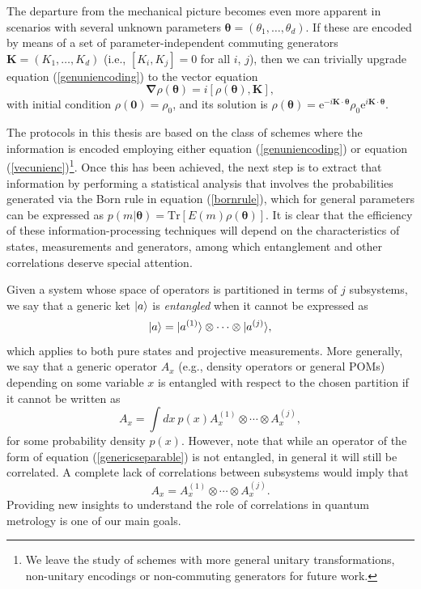 The departure from the mechanical picture becomes even more apparent in scenarios with several unknown parameters $\boldsymbol{\theta} = (\theta_1, \dots, \theta_d)$. If these are encoded by means of a set of parameter-independent commuting generators $\boldsymbol{K} = (K_1, \dots, K_d)$ (i.e., $[K_i, K_j] = 0$ for all $i$, $j$), then we can trivially upgrade equation (\ref{genuniencoding}) to the vector equation 
\begin{equation}
\boldsymbol{\nabla} \rho(\boldsymbol{\theta}) = i \left[ \rho(\boldsymbol{\theta}), \boldsymbol{K} \right],
\label{vecunienc}
\end{equation}
with initial condition $\rho(\boldsymbol{0}) = \rho_0$, and its solution is $\rho(\boldsymbol{\theta}) = \mathrm{e}^{-i \boldsymbol{K} \cdot \boldsymbol{\theta}} \rho_0 \mathrm{e}^{i \boldsymbol{K}\cdot \boldsymbol{\theta}}$.

The protocols in this thesis are based on the class of schemes where the information is encoded employing either equation (\ref{genuniencoding}) or equation (\ref{vecunienc})\footnote{We leave the study of schemes with more general unitary transformations, non-unitary encodings or non-commuting generators \cite{Szczykulska2016, baumgratz2016} for future work.}. Once this has been achieved, the next step is to extract that information by performing a statistical analysis that involves the probabilities generated via the Born rule in equation (\ref{bornrule}), which for general parameters can be expressed as
$p(m|\boldsymbol{\theta})=\mathrm{Tr}\left[E(m)\rho(\boldsymbol{\theta})\right]$. It is clear that the efficiency of these information-processing techniques will depend on the characteristics of states, measurements and generators, among which entanglement and other correlations deserve special attention. 

Given a system whose space of operators is partitioned in terms of $j$ subsystems, we say that a generic ket $\ket{a}$ is \emph{entangled} when it cannot be expressed as
\begin{equation}
\ket{a} = |a^{(1)}\rangle\otimes\cdots\otimes|a^{(j)}\rangle, 
\end{equation}
which applies to both pure states and projective measurements. More generally,
we say that a generic operator $A_x$ (e.g., density operators or general POMs) depending on some variable $x$ is entangled with respect to the chosen partition if it cannot be written as \cite{dunningham2018}
\begin{equation}
A_x = \int dx~p(x)A_x^{(1)}\otimes\cdots\otimes A_x^{(j)},
\label{genericseparable}
\end{equation}
for some probability density $p(x)$. However, note that while an operator of the form of equation (\ref{genericseparable}) is not entangled, in general it will still be correlated. A complete lack of correlations between subsystems would imply that
\begin{equation}
A_x = A_x^{(1)}\otimes\cdots\otimes A_x^{(j)}.
\end{equation}
Providing new insights to understand the role of correlations in quantum metrology is one of our main goals.


